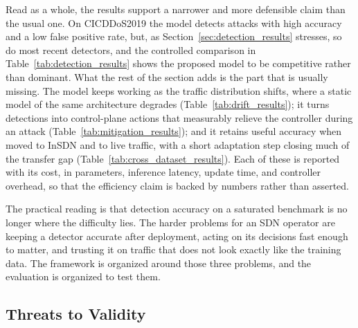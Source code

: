 \documentclass[ASNA,twocolumn]{USG} %
\begin{document}
Read as a whole, the results support a narrower and more defensible claim than the usual one. On CICDDoS2019 the model detects attacks with high accuracy and a low false positive rate, but, as Section~\ref{sec:detection_results} stresses, so do most recent detectors, and the controlled comparison in Table~\ref{tab:detection_results} shows the proposed model to be competitive rather than dominant. What the rest of the section adds is the part that is usually missing. The model keeps working as the traffic distribution shifts, where a static model of the same architecture degrades (Table~\ref{tab:drift_results}); it turns detections into control-plane actions that measurably relieve the controller during an attack (Table~\ref{tab:mitigation_results}); and it retains useful accuracy when moved to InSDN and to live traffic, with a short adaptation step closing much of the transfer gap (Table~\ref{tab:cross_dataset_results}). Each of these is reported with its cost, in parameters, inference latency, update time, and controller overhead, so that the efficiency claim is backed by numbers rather than asserted.

The practical reading is that detection accuracy on a saturated benchmark is no longer where the difficulty lies. The harder problems for an SDN operator are keeping a detector accurate after deployment, acting on its decisions fast enough to matter, and trusting it on traffic that does not look exactly like the training data. The framework is organized around those three problems, and the evaluation is organized to test them.

\subsection{Threats to Validity}
\label{sec:threats}
\end{document}
